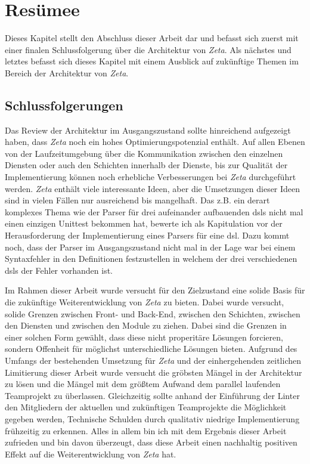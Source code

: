 \chapter{Resümee}

Dieses Kapitel stellt den Abschluss dieser Arbeit dar und befasst sich zuerst mit einer finalen Schlussfolgerung über die Architektur von \textit{Zeta}. Als nächstes und letztes befasst sich dieses Kapitel mit einem Ausblick auf zukünftige Themen im Bereich der Architektur von \textit{Zeta}. 

\section{Schlussfolgerungen}

Das Review der Architektur im Ausgangszustand sollte hinreichend aufgezeigt haben, dass \textit{Zeta} noch ein hohes Optimierungspotenzial enthält. Auf allen Ebenen von der Laufzeitumgebung über die Kommunikation zwischen den einzelnen Diensten oder auch den Schichten innerhalb der Dienste, bis zur Qualität der Implementierung können noch erhebliche Verbesserungen bei \textit{Zeta} durchgeführt werden. \textit{Zeta} enthält viele interessante Ideen, aber die Umsetzungen dieser Ideen sind in vielen Fällen nur ausreichend bis mangelhaft. Das z.B. ein derart komplexes Thema wie der Parser für drei aufeinander aufbauenden \acp{dsl} nicht mal einen einzigen Unittest bekommen hat, bewerte ich als Kapitulation vor der Herausforderung der Implementierung eines Parsers für eine \ac{dsl}. Dazu kommt noch, dass der Parser im Ausgangszustand nicht mal in der Lage war bei einem Syntaxfehler in den Definitionen festzustellen in welchem der drei verschiedenen \acp{dsl} der Fehler vorhanden ist.

Im Rahmen dieser Arbeit wurde versucht für den Zielzustand eine solide Basis für die zukünftige Weiterentwicklung von \textit{Zeta} zu bieten. Dabei wurde versucht, solide Grenzen zwischen Front- und Back-End, zwischen den Schichten, zwischen den Diensten und zwischen den Module zu ziehen. Dabei sind die Grenzen in einer solchen Form gewählt, dass diese nicht properitäre Lösungen forcieren, sondern Offenheit für möglichst unterschiedliche Lösungen bieten. Aufgrund des Umfangs der bestehenden Umsetzung für \textit{Zeta} und der einhergehenden zeitlichen Limitierung dieser Arbeit wurde versucht die gröbsten Mängel in der Architektur zu lösen und die Mängel mit dem größtem Aufwand dem parallel laufenden Teamprojekt zu überlassen. Gleichzeitig sollte anhand der Einführung der Linter den Mitgliedern der aktuellen und zukünftigen Teamprojekte die Möglichkeit gegeben werden, Technische Schulden durch qualitativ niedrige Implementierung frühzeitig zu erkennen. Alles in allem bin ich mit dem Ergebnis dieser Arbeit zufrieden und bin davon überzeugt, dass diese Arbeit einen nachhaltig positiven Effekt auf die Weiterentwicklung von \textit{Zeta} hat.

